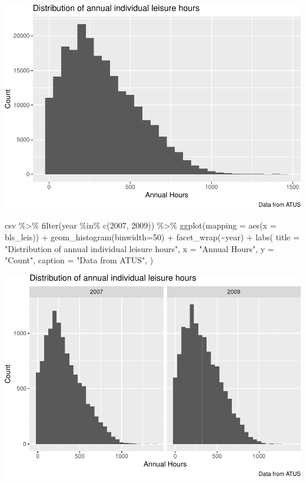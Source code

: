 \documentclass[
]{article}
\newenvironment{Shaded}{\begin{snugshade}}{\end{snugshade}}
\newcommand{\AttributeTok}[1]{\textcolor[rgb]{0.77,0.63,0.00}{#1}}
\newcommand{\DecValTok}[1]{\textcolor[rgb]{0.00,0.00,0.81}{#1}}
\newcommand{\FunctionTok}[1]{\textcolor[rgb]{0.00,0.00,0.00}{#1}}
\newcommand{\NormalTok}[1]{#1}
\newcommand{\SpecialCharTok}[1]{\textcolor[rgb]{0.00,0.00,0.00}{#1}}
\newcommand{\StringTok}[1]{\textcolor[rgb]{0.31,0.60,0.02}{#1}}
\begin{document}
\includegraphics{Paper2_files/figure-latex/graphs-1.pdf}

\begin{Shaded}
\begin{Highlighting}[]
\NormalTok{csv }\SpecialCharTok{\%\textgreater{}\%}
  \FunctionTok{filter}\NormalTok{(year }\SpecialCharTok{\%in\%} \FunctionTok{c}\NormalTok{(}\DecValTok{2007}\NormalTok{, }\DecValTok{2009}\NormalTok{)) }\SpecialCharTok{\%\textgreater{}\%}
  \FunctionTok{ggplot}\NormalTok{(}\AttributeTok{mapping =} \FunctionTok{aes}\NormalTok{(}\AttributeTok{x =}\NormalTok{ bls\_leis)) }\SpecialCharTok{+}
  \FunctionTok{geom\_histogram}\NormalTok{(}\AttributeTok{binwidth=}\DecValTok{50}\NormalTok{) }\SpecialCharTok{+}
  \FunctionTok{facet\_wrap}\NormalTok{(}\SpecialCharTok{\textasciitilde{}}\NormalTok{year) }\SpecialCharTok{+}
  \FunctionTok{labs}\NormalTok{(}
  \AttributeTok{title =} \StringTok{"Distribution of annual individual leisure hours"}\NormalTok{,}
  \AttributeTok{x =} \StringTok{"Annual Hours"}\NormalTok{,}
  \AttributeTok{y =} \StringTok{"Count"}\NormalTok{,}
  \AttributeTok{caption =} \StringTok{"Data from ATUS"}\NormalTok{,}
\NormalTok{)}
\end{Highlighting}
\end{Shaded}

\includegraphics{Paper2_files/figure-latex/graphs-2.pdf}
\end{document}
